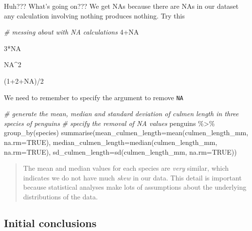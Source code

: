 \documentclass[
]{book}
\newenvironment{Shaded}{\begin{snugshade}}{\end{snugshade}}
\newcommand{\AttributeTok}[1]{\textcolor[rgb]{0.77,0.63,0.00}{#1}}
\newcommand{\CommentTok}[1]{\textcolor[rgb]{0.56,0.35,0.01}{\textit{#1}}}
\newcommand{\ConstantTok}[1]{\textcolor[rgb]{0.00,0.00,0.00}{#1}}
\newcommand{\DecValTok}[1]{\textcolor[rgb]{0.00,0.00,0.81}{#1}}
\newcommand{\FunctionTok}[1]{\textcolor[rgb]{0.00,0.00,0.00}{#1}}
\newcommand{\NormalTok}[1]{#1}
\newcommand{\SpecialCharTok}[1]{\textcolor[rgb]{0.00,0.00,0.00}{#1}}
\begin{document}
Huh??? What's going on??? We get NAs because there are NAs in our dataset any calculation involving nothing produces nothing. Try this

\begin{Shaded}
\begin{Highlighting}[]
\CommentTok{\# messing about with NA calculations}
\DecValTok{4}\SpecialCharTok{+}\ConstantTok{NA}

\DecValTok{3}\SpecialCharTok{*}\ConstantTok{NA}

\ConstantTok{NA}\SpecialCharTok{\^{}}\DecValTok{2}

\NormalTok{(}\DecValTok{1}\SpecialCharTok{+}\DecValTok{2}\SpecialCharTok{+}\ConstantTok{NA}\NormalTok{)}\SpecialCharTok{/}\DecValTok{2}
\end{Highlighting}
\end{Shaded}

We need to remember to specify the argument to remove \texttt{NA}

\begin{Shaded}
\begin{Highlighting}[]
\CommentTok{\# generate the mean, median and standard deviation of culmen length in three species of penguins}
\CommentTok{\# specify the removal of NA values}
\NormalTok{penguins }\SpecialCharTok{\%\textgreater{}\%} 
  \FunctionTok{group\_by}\NormalTok{(species)}
  \FunctionTok{summarise}\NormalTok{(}\AttributeTok{mean\_culmen\_length=}\FunctionTok{mean}\NormalTok{(culmen\_length\_mm, }\AttributeTok{na.rm=}\ConstantTok{TRUE}\NormalTok{),}
            \AttributeTok{median\_culmen\_length=}\FunctionTok{median}\NormalTok{(culmen\_length\_mm, }\AttributeTok{na.rm=}\ConstantTok{TRUE}\NormalTok{),}
            \AttributeTok{sd\_culmen\_length=}\FunctionTok{sd}\NormalTok{(culmen\_length\_mm, }\AttributeTok{na.rm=}\ConstantTok{TRUE}\NormalTok{))}
\end{Highlighting}
\end{Shaded}

\begin{quote}
The mean and median values for each species are \emph{very} similar, which indicates we do not have much \emph{skew} in our data. This detail is important because statistical analyses make lots of assumptions about the underlying distributions of the data.
\end{quote}

\hypertarget{initial-conclusions}{%
\subsection{Initial conclusions}\label{initial-conclusions}}
\end{document}
